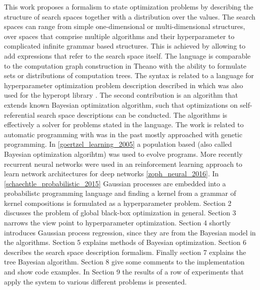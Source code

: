\documentclass[english]{article}
\begin{document}
This work proposes a formalism to state optimization problems by describing the structure of search spaces together with a distribution over the values. The search spaces can range from simple one-dimensional or multi-dimensional structures, over spaces that comprise multiple algorithms and their hyperparameter to complicated infinite grammar based structures. This is achieved by allowing to add expressions that refer to the search space itself. The language is comparable to the computation graph construction in Theano with the ability to formulate sets or distributions of computation trees. The syntax is related to a language for hyperparameter optimization problem description described in \cite{bergstra_making_2013} which was also used for the hyperopt library \cite{bergstra_hyperopt:_2013}. The second contribution is an algorithm that extends known Bayesian optimization algorithm, such that optimizations on self-referential search space descriptions can be conducted. The algorithms is effectively a solver for problems stated in the language.
The work is related to automatic programming with was in the past mostly approached with genetic programming. In \ref{goertzel_learning_2005} a population based (also called Bayesian optimization algorihtm) was used to evolve programs. More recently recurrent neural networks were used in an reinforcement learning approach to learn network architectures for deep networks \ref{zoph_neural_2016}. In \ref{schaechtle_probabilistic_2015} Gaussian processes are embedded into a probabilistc programming language and finding a kernel from a grammar of kernel compositions is formulated as a hyperparameter problem.
Section 2 discusses the problem of global black-box optimization in general. Section 3 narrows the view point to hyperparameter optimization.
Section 4 shortly introduces Gaussian process regression, since they are from the Bayesian model in the algorithms.
Section 5 explains methods of Bayesian optimization.
Section 6 describes the search space description formalism.
Finally section 7 explains the tree Bayesian algorithm.
Section 8 give some comments to the implementation and show code examples.
In Section 9 the results of a row of experiments that apply the system to various different problems is presented.

\newpage
\end{document}

